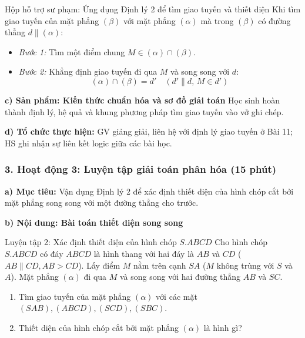 \documentclass[12pt, a4paper]{article}
\begin{document}
\begin{scaffoldbox}{Hộp hỗ trợ sư phạm: Ứng dụng Định lý 2 để tìm giao tuyến và thiết diện}
Khi tìm giao tuyến của mặt phẳng $(\beta)$ với mặt phẳng $(\alpha)$ mà trong $(\beta)$ có đường thẳng $d \parallel (\alpha)$:
\begin{itemize}[leftmargin=0.6cm]
    \item \textit{Bước 1:} Tìm một điểm chung $M \in (\alpha) \cap (\beta)$.
    \item \textit{Bước 2:} Khẳng định giao tuyến đi qua $M$ và song song với $d$:
    $$(\alpha) \cap (\beta) = d' \quad (d' \parallel d, \, M \in d')$$
\end{itemize}
\end{scaffoldbox}

\noindent \textbf{c) Sản phẩm: Kiến thức chuẩn hóa và sơ đồ giải toán}
Học sinh hoàn thành định lý, hệ quả và khung phương pháp tìm giao tuyến vào vở ghi chép.

\noindent \textbf{d) Tổ chức thực hiện:}
GV giảng giải, liên hệ với định lý giao tuyến ở Bài 11; HS ghi nhận sự liên kết logic giữa các bài học.

\subsubsection*{3. Hoạt động 3: Luyện tập giải toán phân hóa (15 phút)}

\noindent \textbf{a) Mục tiêu:}
Vận dụng Định lý 2 để xác định thiết diện của hình chóp cắt bởi mặt phẳng song song với một đường thẳng cho trước.

\noindent \textbf{b) Nội dung: Bài toán thiết diện song song}
\begin{pedabox}{Luyện tập 2: Xác định thiết diện của hình chóp $S.ABCD$}
Cho hình chóp $S.ABCD$ có đáy $ABCD$ là hình thang với hai đáy là $AB$ và $CD$ ($AB \parallel CD, AB > CD$). Lấy điểm $M$ nằm trên cạnh $SA$ ($M$ không trùng với $S$ và $A$). Mặt phẳng $(\alpha)$ đi qua $M$ và song song với hai đường thẳng $AB$ và $SC$.
\begin{enumerate}[leftmargin=0.6cm]
    \item Tìm giao tuyến của mặt phẳng $(\alpha)$ với các mặt $(SAB), (ABCD), (SCD), (SBC)$.
    \item Thiết diện của hình chóp cắt bởi mặt phẳng $(\alpha)$ là hình gì?
\end{enumerate}
\end{pedabox}
\end{document}
